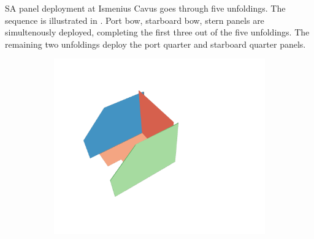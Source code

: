 \vspace{0.5cm}

\ac{SA} panel deployment at Ismenius Cavus goes through five unfoldings. The sequence is illustrated in . Port bow, starboard bow, stern panels are simultenously deployed, completing the first three out of the five unfoldings. The remaining two unfoldings deploy the port quarter and starboard quarter panels.

\vspace{0.5cm}

\begin{figure}[h]
\captionsetup[subfigure]{justification=centering}
\vspace{-2ex}
	\centering
    \setlength{\subfigureWidth}{0.32\textwidth}
    \setlength{\graphicsHeight}{30mm}
    \hypersetup{hidelinks=true}%
	\begin{subfigure}[t]{\subfigureWidth}
        \centering
		\includegraphics[height=\graphicsHeight]{sections/design/solar-array/images/deployment/ismenius-cavus/solar_array_deployment_ismenius_cavus_000.png}
		\label{fig:sub:deployment-sequence-ismenius-cavus-stowed}
	\end{subfigure}\hfill
	\begin{subfigure}[t]{\subfigureWidth}
        \centering

\end{subfigure}
\end{figure}

